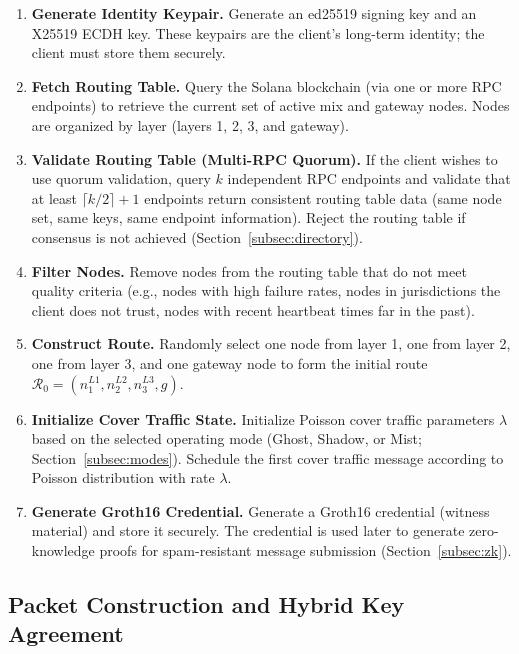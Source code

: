 \documentclass[11pt]{article}
\theoremstyle{definition}
\theoremstyle{remark}
\begin{document}
\begin{enumerate}
    \item \textbf{Generate Identity Keypair.} Generate an ed25519 signing key and an X25519 ECDH key. These keypairs are the client's long-term identity; the client must store them securely.

    \item \textbf{Fetch Routing Table.} Query the Solana blockchain (via one or more RPC endpoints) to retrieve the current set of active mix and gateway nodes. Nodes are organized by layer (layers 1, 2, 3, and gateway).

    \item \textbf{Validate Routing Table (Multi-RPC Quorum).} If the client wishes to use quorum validation, query $k$ independent RPC endpoints and validate that at least $\lceil k/2 \rceil + 1$ endpoints return consistent routing table data (same node set, same keys, same endpoint information). Reject the routing table if consensus is not achieved (Section~\ref{subsec:directory}).

    \item \textbf{Filter Nodes.} Remove nodes from the routing table that do not meet quality criteria (e.g., nodes with high failure rates, nodes in jurisdictions the client does not trust, nodes with recent heartbeat times far in the past).

    \item \textbf{Construct Route.} Randomly select one node from layer 1, one from layer 2, one from layer 3, and one gateway node to form the initial route $\mathcal{R}_0 = (n_1^{L1}, n_2^{L2}, n_3^{L3}, g)$.

    \item \textbf{Initialize Cover Traffic State.} Initialize Poisson cover traffic parameters $\lambda$ based on the selected operating mode (Ghost, Shadow, or Mist; Section~\ref{subsec:modes}). Schedule the first cover traffic message according to Poisson distribution with rate $\lambda$.

    \item \textbf{Generate Groth16 Credential.} Generate a Groth16 credential (witness material) and store it securely. The credential is used later to generate zero-knowledge proofs for spam-resistant message submission (Section~\ref{subsec:zk}).
\end{enumerate}

\subsection{Packet Construction and Hybrid Key Agreement}
\label{subsec:packet}
\end{document}

